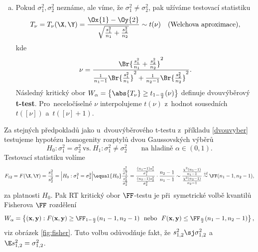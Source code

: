 \begin{example}
\begin{enumerate}[a)]
	\item Pokud $\sigma_1^2,\sigma_2^2$ neznáme, ale víme, že $\sigma_1^2\neq\sigma_2^2$, pak užíváme testovací statistiku
	$$ T_\nu=T_\nu(\X,\Y) =\frac{\Ox{1}-\Oy{2}}{\sqrt{\frac{s_1^2}{n_1}+\frac{s_2^2}{n_2}}}\sim t(\nu)\quad\text{(Welchova aproximace)},$$
	kde $$\nu=\frac{\Br{\frac{s_1^2}{n_1}+\frac{s_2^2}{n_2}}^2}{\frac{1}{n_1-1}\Br{\frac{s_1^2}{n_1}}^2+\frac{1}{n_2-1}\Br{\frac{s_2^2}{n_2}}^2}.$$ Následný kritický obor 
 $W_\alpha=\left\{\abs{T_\nu}\geq t_{1-\frac{\alpha}{2}}(\nu)\right\}$ definuje dvouvýběrový \textbf{t-test}. Pro~neceločíselné $\nu$ interpolujeme $t(\nu)$ z~hodnot sousedních $t{([\nu])}$ a~$t{([\nu]+1)}$.
\end{enumerate}
\end{example}

\begin{example}[Test homogenity rozptylů = F-test]
	Za stejných předpokladů jako u~dvouvýběrového t-testu z~příkladu \ref{dvouvyber} testujeme hypotézu homogenity rozptylů dvou Gaussovských výběrů
	$$ H_0:\sigma_1^2=\sigma_2^2~\text{vs.}~H_1:\sigma_1^2\neq \sigma_2^2\qquad \text{na~hladině }\alpha\in(0,1). $$
	Testovací statistiku volíme
	$$ F_{12}=F(\X,\Y)=\frac{s_1^2}{s_2^2}=\Big| H_0:\sigma^2_1=\sigma_2^2 \Big|\equal{H_0}\frac{\frac{s_1^2}{\sigma_1^2}}{\frac{s_2^2}{\sigma_2^2}}=\frac{\frac{(n_1-1)s_1^2}{\sigma_1^2}}{\frac{(n_2-1)s_2^2}{\sigma_2^2}}\cdot\frac{n_2-1}{n_1-1}\sim \frac{\frac{\chi^2(n_1-1)}{n_1-1}}{\frac{\chi^2(n_2-1)}{n_2-1}}\stackrel{id}{\sim} \FF(n_1-1,n_2-1), $$
	za platnosti $H_0$. Pak RT kritický obor $\FF$-testu je při~symetrické volbě kvantilů Fisherova $\FF$ rozdělení
	$$ W_\alpha=\left\{ (\textbf{x},\textbf{y}):F(\textbf{x},\textbf{y})\geq \FF_{1-\frac{\alpha}{2}}(n_1-1,n_2-1)\text{~~nebo~~}F(\textbf{x},\textbf{y})\leq \FF_{\frac{\alpha}{2}}(n_1-1,n_2-1) \right\}, $$
	viz obrázek \ref{fig:fisher}. Tuto volbu odůvodňuje fakt, že $s_{1,2}^2\sj \sigma_{1,2}^2$ a~$\E s_{1,2}^2=\sigma_{1,2}^2$.
\end{example}
